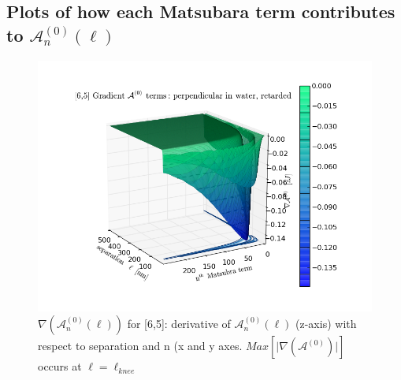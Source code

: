 \documentclass[a4paper]{article}
\begin{document}
\begin{center}
\section{Plots of how each Matsubara term contributes to $\mathcal{A}_{n}^{(0)}(\ell)$}
\begin{figure}[t!]
\begin{center}
\includegraphics[width=1.4\textwidth]{plots/grad_A0_65.png}
\hskip 43pt
\caption{$\nabla(\mathcal{A}_{n}^{(0)}(\ell))$ for [6,5]: derivative of
$\mathcal{A}_{n}^{(0)}(\ell)$ (z-axis) with respect to separation and n (x and
y axes. $Max[\lvert \nabla(\mathcal{A}^{(0)}) \rvert]$ occurs at
$\ell=\ell_{knee}$}
\label{eiz65}
\end{center}
\end{figure} 


\end{center}
\end{document}
